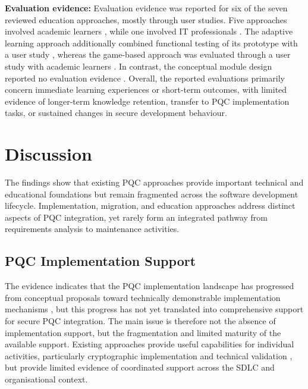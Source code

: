 \documentclass[letterpaper,twocolumn,10pt]{article}
\begin{document}
\textbf{Evaluation evidence: } Evaluation evidence was reported for six of the seven reviewed education approaches, mostly through user studies. Five approaches involved academic learners \cite{Ana_borrelli_towards_2025, Ana_borrelli_designing_2024, Ana_edComScSociety, Ana_PQCLabEdu, Ana_abdelhamid_wip_2024}, while one involved IT professionals \cite{Ana_PQCIP}. The adaptive learning approach additionally combined functional testing of its prototype with a user study \cite{Ana_PQCLabEdu}, whereas the game-based approach was evaluated through a user study with academic learners \cite{Ana_abdelhamid_wip_2024}. In contrast, the conceptual module design reported no evaluation evidence \cite{Ana_EducModule}. Overall, the reported evaluations primarily concern immediate learning experiences or short-term outcomes, with limited evidence of longer-term knowledge retention, transfer to PQC implementation tasks, or sustained changes in secure development behaviour.

\section{Discussion}
\label{Discuss}

The findings show that existing PQC approaches provide important technical and educational foundations but remain fragmented across the software development lifecycle. Implementation, migration, and education approaches address distinct aspects of PQC integration, yet rarely form an integrated pathway from requirements analysis to maintenance activities. 

\subsection{PQC Implementation Support}
\label{DisImReady}

The evidence indicates that the PQC implementation landscape has progressed from conceptual proposals toward technically demonstrable implementation mechanisms \cite{Ana_huelsing2021wireguard, Ana_ojha2025adoption, Ana_tsili_scalable_2025, Ana_hekkala_implementing_2023}, but this progress has not yet translated into comprehensive support for secure PQC integration. The main issue is therefore not the absence of implementation support, but the fragmentation and limited maturity of the available support. Existing approaches provide useful capabilities for individual activities, particularly cryptographic implementation and technical validation \cite{Ana_hekkala_implementing_2023, Ana_saucedo-estrada_post-quantum_2020, Ana_kannwischer_improving_2022, Ana_e27020212, Ana_PQCLeo25}, but provide limited evidence of coordinated support across the SDLC and organisational context.
\end{document}
